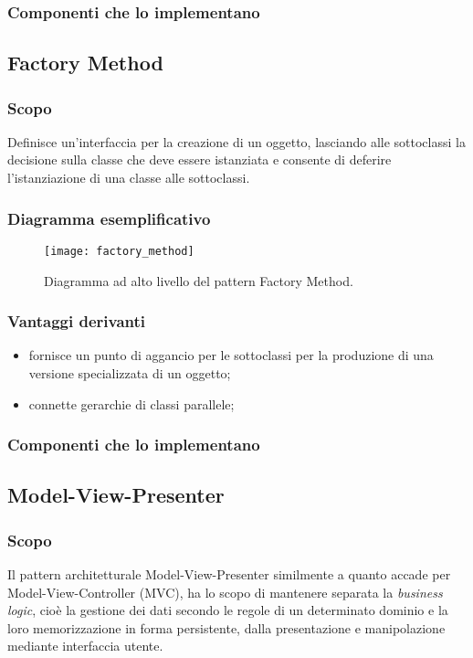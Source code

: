 \subsubsection{Componenti che lo implementano}


\subsection{Factory Method}
\subsubsection{Scopo}
Definisce un'interfaccia per la creazione di un oggetto, lasciando alle sottoclassi la decisione sulla classe che deve essere istanziata e consente di deferire l'istanziazione di una classe alle sottoclassi.
\subsubsection{Diagramma esemplificativo}
\begin{figure}[h]
\centering
\texttt{[image: factory\_method]}
\caption{Diagramma ad alto livello del pattern Factory Method.}\label{fig:factory_method}
\end{figure}
\subsubsection{Vantaggi derivanti}
\begin{itemize}
\item fornisce un punto di aggancio per le sottoclassi per la produzione di una versione specializzata di un oggetto;
\item connette gerarchie di classi parallele;
\end{itemize}
\subsubsection{Componenti che lo implementano}

\subsection{Model-View-Presenter}

\subsubsection{Scopo}
Il pattern architetturale \foreignlanguage{english}{Model-View-Presenter} similmente a quanto accade per \foreignlanguage{english}{Model-View-Controller} (MVC), ha lo scopo di mantenere separata la \textit{business logic}, cioè la gestione dei dati secondo le regole di un determinato dominio e la loro memorizzazione in forma persistente, dalla presentazione e manipolazione mediante interfaccia utente.

